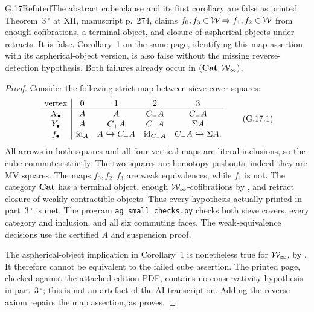 \begin{claim}{G.17}{Refuted}{The abstract cube clause and its first corollary are false as printed}
Theorem~3\,$^\circ$ at XII, manuscript p.~274, claims $f_0,f_3\in\mathcal{W}\Rightarrow f_1,f_2\in\mathcal{W}$ from enough cofibrations, a terminal object, and closure of aspherical objects under retracts. It is false. Corollary~1 on the same page, identifying this map assertion with its aspherical-object version, is also false without the missing reverse-detection hypothesis. Both failures already occur in $(\mathbf{Cat},\mathcal{W}_{\infty})$.
\end{claim}
\begin{proof}
Consider the following strict map between sieve-cover squares:
\[
\begin{array}{c|cccc}
\text{vertex}&0&1&2&3\\ \hline
X_\bullet&A&A&C_-A&C_-A\\
Y_\bullet&A&C_+A&C_-A&\Sigma A\\
f_\bullet&\mathrm{id}_A&A\hookrightarrow C_+A&\mathrm{id}_{C_-A}&C_-A\hookrightarrow\Sigma A.
\end{array}                                                     \tag{G.17.1}
\]
All arrows in both squares and all four vertical maps are literal inclusions, so the cube commutes strictly. The two squares are homotopy pushouts; indeed they are MV squares. The maps $f_0,f_2,f_3$ are weak equivalences, while $f_1$ is not. The category $\mathbf{Cat}$ has a terminal object, enough $\mathcal{W}_{\infty}$-cofibrations by , and retract closure of weakly contractible objects. Thus every hypothesis actually printed in part~3\,$^\circ$ is met. The program \texttt{ag\_small\_checks.py} checks both sieve covers, every category and inclusion, and all six commuting faces. The weak-equivalence decisions use the certified $A$ and suspension proof.

The aspherical-object implication in Corollary~1 is nonetheless true for $\mathcal{W}_{\infty}$, by . It therefore cannot be equivalent to the failed cube assertion. The printed page, checked against the attached edition PDF, contains no conservativity hypothesis in part~3\,$^\circ$; this is not an artefact of the AI transcription. Adding the reverse axiom repairs the map assertion, as  proves.
\end{proof}

